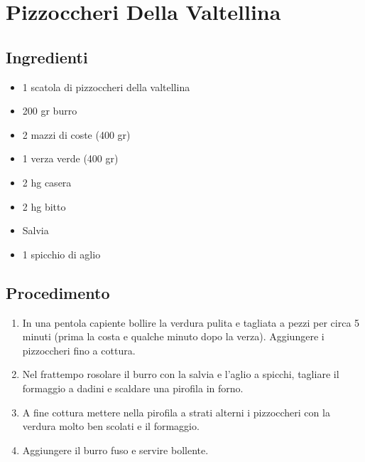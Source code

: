 \section{Pizzoccheri Della Valtellina}
\subsection{Ingredienti}
\begin{itemize}
\item 1 scatola di pizzoccheri della valtellina  
\item 200 gr burro  
\item 2 mazzi di coste (400 gr)  
\item 1 verza verde (400 gr)  
\item 2 hg casera  
\item 2 hg bitto  
\item Salvia  
\item 1 spicchio di aglio
\end{itemize}
\subsection{Procedimento}
\begin{enumerate}
\item  In una pentola capiente bollire la verdura pulita e tagliata a pezzi per circa 5 minuti (prima la costa e qualche minuto dopo la verza). Aggiungere i pizzoccheri fino a cottura.  
\item  Nel frattempo rosolare il burro con la salvia e l'aglio a spicchi, tagliare il formaggio a dadini e scaldare una pirofila in forno.  
\item  A fine cottura mettere nella pirofila a strati alterni i pizzoccheri con la verdura molto ben scolati e il formaggio.  
\item  Aggiungere il burro fuso e servire bollente.
\end{enumerate}
